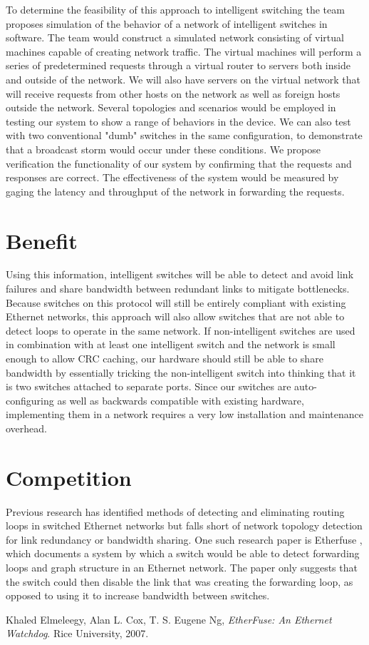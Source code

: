 \documentclass{article}
\begin{document}
	To determine the feasibility of this approach to intelligent switching the team proposes simulation of the behavior of a network of intelligent switches in software.
	The team would construct a simulated network consisting of virtual machines capable of creating network traffic.
	The virtual machines will perform a series of predetermined requests through a virtual router to servers both inside and outside of the network.
	We will also have servers on the virtual network that will receive requests from other hosts on the network as well as foreign hosts outside the network.
	Several topologies and scenarios would be employed in testing our system to show a range of behaviors in the device.
	We can also test with two conventional "dumb" switches in the same configuration, to demonstrate that a broadcast storm would occur under these conditions.
	We propose verification the functionality of our system by confirming that the requests and responses are correct.
	The effectiveness of the system would be measured by gaging the latency and throughput of the network in forwarding the requests.
\section{Benefit}
	Using this information, intelligent switches will be able to detect and avoid link failures and share bandwidth between redundant links to mitigate bottlenecks.
	Because switches on this protocol will still be entirely compliant with existing Ethernet networks, this approach will also allow switches that are not able to detect loops to operate in the same network.
	If non-intelligent switches are used in combination with at least one intelligent switch and the network is small enough to allow CRC caching, our hardware should still be able to share bandwidth by essentially tricking the non-intelligent switch into thinking that it is two switches attached to separate ports.
	Since our switches are auto-configuring as well as backwards compatible with existing hardware, implementing them in a network requires a very low installation and maintenance overhead.
\section{Competition}
	Previous research has identified methods of detecting and eliminating routing loops in switched Ethernet networks but falls short of network topology detection for link redundancy or bandwidth sharing.
	One such research paper is Etherfuse \cite{etherfuse}, which documents a system by which a switch would be able to detect forwarding loops and graph structure in an Ethernet network.
	The paper only suggests that the switch could then disable the link that was creating the forwarding loop, as opposed to using it to increase bandwidth between switches.
	
\begin{thebibliography}{9}
	Khaled Elmeleegy, Alan L. Cox, T. S. Eugene Ng,
	\emph{EtherFuse: An Ethernet Watchdog}.
	Rice University, 2007.
\end{thebibliography}
\end{document}
